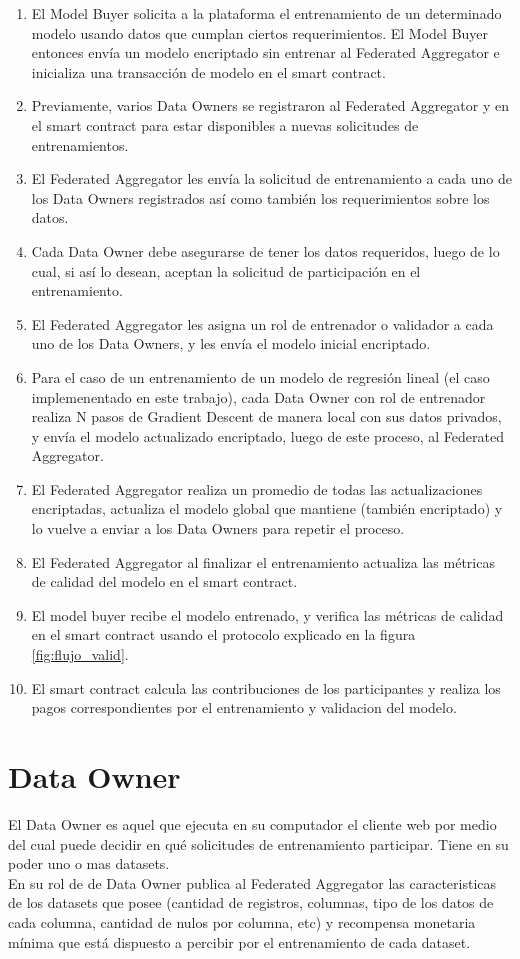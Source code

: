 \documentclass[
11pt, %
oneside, %
spanish, %
singlespacing, %
parskip, %
headsepline, %
chapterinoneline, %
]{MastersDoctoralThesis} %
\begin{document}
\begin{enumerate}
\item El Model Buyer solicita a la plataforma el entrenamiento de un determinado modelo usando datos que cumplan ciertos requerimientos. El Model Buyer entonces envía un modelo encriptado sin entrenar al Federated Aggregator e inicializa una transacción de modelo en el smart contract.
\item Previamente, varios Data Owners se registraron al Federated Aggregator y en el smart contract para estar disponibles a nuevas solicitudes de entrenamientos.
\item El Federated Aggregator les envía la solicitud de entrenamiento a cada uno de los Data Owners registrados así como también los requerimientos sobre los datos.
\item Cada Data Owner debe asegurarse de tener los datos requeridos, luego de lo cual, si así lo desean, aceptan la solicitud de participación en el entrenamiento.
\item El Federated Aggregator les asigna un rol de entrenador o validador a cada uno de los Data Owners, y les envía el modelo inicial encriptado.
\item Para el caso de un entrenamiento de un modelo de regresión lineal (el caso implemenentado en este trabajo), cada Data Owner con rol de entrenador realiza N pasos de Gradient Descent de manera local con sus datos privados, y envía el modelo actualizado encriptado, luego de este proceso, al Federated Aggregator.
\item El Federated Aggregator realiza un promedio de todas las actualizaciones encriptadas, actualiza el modelo global que mantiene (también encriptado) y lo vuelve a enviar a los Data Owners para repetir el proceso.
\item El Federated Aggregator al finalizar el entrenamiento actualiza las métricas de calidad del modelo en el smart contract.
\item El model buyer recibe el modelo entrenado, y verifica las métricas de calidad en el smart contract usando el protocolo explicado en la figura \ref{fig:flujo_valid}.
\item El smart contract calcula las contribuciones de los participantes y realiza los pagos correspondientes por el entrenamiento y validacion del modelo.
\end{enumerate}


\section{Data Owner}
\justify
El Data Owner es aquel que ejecuta en su computador el cliente web por medio del cual puede decidir en qué solicitudes de entrenamiento participar. Tiene en su poder uno o mas datasets. \\
En su rol de de Data Owner publica al Federated Aggregator las caracteristicas de los datasets que posee (cantidad de registros, columnas, tipo de los datos de cada columna, cantidad de nulos por columna, etc) y recompensa monetaria mínima que está dispuesto a percibir por el entrenamiento de cada dataset.
\end{document}
